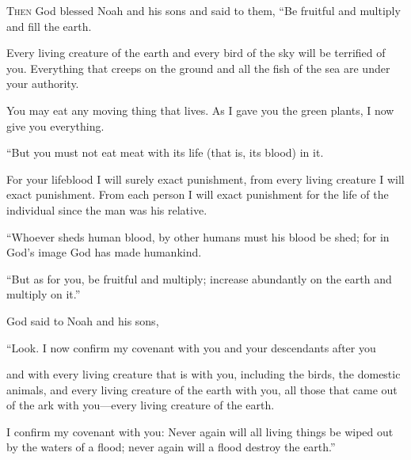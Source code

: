\begin{scripture}
 \allowchapbreak\hypertarget{ch-genesis-9}{}\lettrine[lines=5]{\color{pentateuch}T}{\textsc{hen}} God blessed Noah and his sons and said to them, ``Be fruitful and multiply and fill the earth.\everypar{}
 Every living creature of the earth and every bird of the sky will be terrified of you. Everything that creeps on the ground and all the fish of the sea are under your authority.
 You may eat any moving thing that lives. As I gave you the green plants, I now give you everything.
\everypar{}

 ``But you must not eat meat with its life (that is, its blood) in it.
 For your lifeblood I will surely exact punishment, from every living creature I will exact punishment. From each person I will exact punishment for the life of the individual since the man was his relative.
\everypar{}

 ``Whoever sheds human blood, by other humans must his blood be shed; for in God's image God has made humankind.
\everypar{}

 ``But as for you, be fruitful and multiply; increase abundantly on the earth and multiply on it.''
\everypar{}

 God said to Noah and his sons,
 ``Look. I now confirm my covenant with you and your descendants after you
 and with every living creature that is with you, including the birds, the domestic animals, and every living creature of the earth with you, all those that came out of the ark with you---every living creature of the earth.
 I confirm my covenant with you: Never again will all living things be wiped out by the waters of a flood; never again will a flood destroy the earth.''
\everypar{}


\end{scripture}
